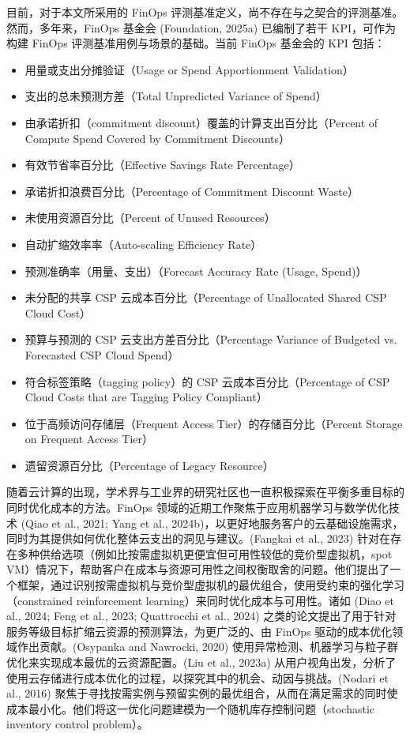 目前，对于本文所采用的 FinOps 评测基准定义，尚不存在与之契合的评测基准。然而，多年来，FinOps 基金会 (Foundation, 2025a) 已编制了若干 KPI，可作为构建 FinOps 评测基准用例与场景的基础。当前 FinOps 基金会的 KPI 包括：

\begin{itemize}
\item 用量或支出分摊验证（Usage or Spend Apportionment Validation）
\item 支出的总未预测方差（Total Unpredicted Variance of Spend）
\item 由承诺折扣（commitment discount）覆盖的计算支出百分比（Percent of Compute Spend Covered by Commitment Discounts）
\item 有效节省率百分比（Effective Savings Rate Percentage）
\item 承诺折扣浪费百分比（Percentage of Commitment Discount Waste）
\item 未使用资源百分比（Percent of Unused Resources）
\item 自动扩缩效率率（Auto-scaling Efficiency Rate）
\item 预测准确率（用量、支出）（Forecast Accuracy Rate (Usage, Spend)）
\item 未分配的共享 CSP 云成本百分比（Percentage of Unallocated Shared CSP Cloud Cost）
\item 预算与预测的 CSP 云支出方差百分比（Percentage Variance of Budgeted vs. Forecasted CSP Cloud Spend）
\item 符合标签策略（tagging policy）的 CSP 云成本百分比（Percentage of CSP Cloud Costs that are Tagging Policy Compliant）
\item 位于高频访问存储层（Frequent Access Tier）的存储百分比（Percent Storage on Frequent Access Tier）
\item 遗留资源百分比（Percentage of Legacy Resource）
\end{itemize}

随着云计算的出现，学术界与工业界的研究社区也一直积极探索在平衡多重目标的同时优化成本的方法。FinOps 领域的近期工作聚焦于应用机器学习与数学优化技术 (Qiao et al., 2021; Yang et al., 2024b)，以更好地服务客户的云基础设施需求，同时为其提供如何优化整体云支出的洞见与建议。(Fangkai et al., 2023) 针对在存在多种供给选项（例如比按需虚拟机更便宜但可用性较低的竞价型虚拟机，spot VM）情况下，帮助客户在成本与资源可用性之间权衡取舍的问题。他们提出了一个框架，通过识别按需虚拟机与竞价型虚拟机的最优组合，使用受约束的强化学习（constrained reinforcement learning）来同时优化成本与可用性。诸如 (Diao et al., 2024; Feng et al., 2023; Quattrocchi et al., 2024) 之类的论文提出了用于针对服务等级目标扩缩云资源的预测算法，为更广泛的、由 FinOps 驱动的成本优化领域作出贡献。(Osypanka and Nawrocki, 2020) 使用异常检测、机器学习与粒子群优化来实现成本最优的云资源配置。(Liu et al., 2023a) 从用户视角出发，分析了使用云存储进行成本优化的过程，以探究其中的机会、动因与挑战。(Nodari et al., 2016) 聚焦于寻找按需实例与预留实例的最优组合，从而在满足需求的同时使成本最小化。他们将这一优化问题建模为一个随机库存控制问题（stochastic inventory control problem）。

